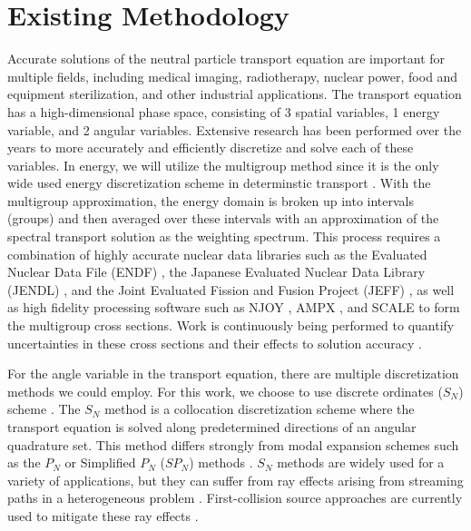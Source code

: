 \documentclass[11pt]{article}
\begin{document}
\section{Existing Methodology}
\label{sec::PS}
Accurate solutions of the neutral particle transport equation are important for multiple fields, including medical imaging, radiotherapy, nuclear power, food and equipment sterilization, and other industrial applications. The transport equation has a high-dimensional phase space, consisting of 3 spatial variables, 1 energy variable, and 2 angular variables. Extensive research has been performed over the years to more accurately and efficiently discretize and solve each of these variables. In energy, we will utilize the multigroup method since it is the only wide used energy discretization scheme in determinstic transport \cite{duderstadt1976nuclear,bell1979nuclear}. With the multigroup approximation, the energy domain is broken up into intervals (groups) and then averaged over these intervals with an approximation of the spectral transport solution as the weighting spectrum. This process requires a combination of highly accurate nuclear data libraries such as the Evaluated Nuclear Data File (ENDF) \cite{chadwick2006endf,chadwick2011endf}, the Japanese Evaluated Nuclear Data Library (JENDL) \cite{shibata2002japanese}, and the Joint Evaluated Fission and Fusion Project (JEFF) \cite{koning2006jeff}, as well as high fidelity processing software such as NJOY \cite{macfarlane2002njoy,kahler2012njoy}, AMPX \cite{dunn2002ampx}, and SCALE \cite{bucholz1982scale} to form the multigroup cross sections. Work is continuously being performed to quantify uncertainties in these cross sections and their effects to solution accuracy \cite{aliberti2006nuclear,jessee2008cross}.

For the angle variable in the transport equation, there are multiple discretization methods we could employ. For this work, we choose to use discrete ordinates ($S_N$) scheme \cite{carlson1968computing,lewis1984computational}. The $S_N$ method is a collocation discretization scheme where the transport equation is solved along predetermined directions of an angular quadrature set. This method differs strongly from modal expansion schemes such as the $P_N$ or Simplified $P_N$ ($SP_N$) methods \cite{bell1979nuclear,gelbard1960application}. $S_N$ methods are widely used for a variety of applications, but they can suffer from ray effects arising from streaming paths in a heterogeneous problem \cite{lathrop1968ray}. First-collision source approaches are currently used to mitigate these ray effects \cite{lathrop1971remedies,morel_rayeffects}.
\end{document}
